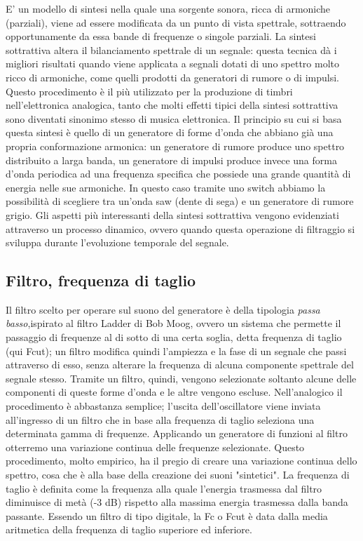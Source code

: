 \documentclass[
	a4paper,
	twocolumn
	]{article}
\begin{document}
E’ un modello di sintesi nella quale una sorgente sonora, ricca di armoniche
(parziali), viene ad essere modificata da un punto di vista spettrale,
sottraendo opportunamente da essa bande di frequenze o singole parziali. La
sintesi sottrattiva altera il bilanciamento spettrale di un segnale: questa
tecnica dà i migliori risultati quando viene applicata a segnali dotati di uno
spettro molto ricco di armoniche, come quelli prodotti da generatori di rumore
o di impulsi. Questo procedimento è il più utilizzato per la produzione di
timbri nell'elettronica analogica, tanto che molti effetti tipici della sintesi
sottrattiva sono diventati sinonimo stesso di musica elettronica. Il principio
su cui si basa questa sintesi è quello di un generatore di forme
d'onda che abbiano già una propria conformazione armonica: un generatore di
rumore produce uno spettro distribuito a larga banda, un generatore di impulsi
produce invece una forma d’onda periodica ad una frequenza specifica che
possiede una grande quantità di energia nelle sue armoniche. In questo caso
tramite uno switch abbiamo la possibilità di scegliere tra un’onda saw (dente
di sega) e un generatore di rumore grigio.
Gli aspetti più interessanti della sintesi sottrattiva vengono evidenziati
attraverso un processo dinamico, ovvero quando questa operazione di filtraggio
si sviluppa durante l’evoluzione temporale del segnale.

\subsection*{Filtro, frequenza di taglio}

Il filtro scelto per operare sul suono del generatore è della tipologia
\emph{passa basso},ispirato al filtro Ladder di Bob Moog, ovvero un sistema che
permette il passaggio di frequenze al di sotto di una certa soglia, detta
frequenza di taglio (qui Fcut); un filtro modifica quindi l’ampiezza e la fase
di un segnale che passi attraverso di esso, senza alterare la frequenza di
alcuna componente spettrale del segnale stesso.
Tramite un filtro, quindi, vengono selezionate soltanto alcune delle componenti
di queste forme d'onda e le altre vengono escluse. Nell'analogico il
procedimento è abbastanza semplice; l'uscita dell'oscillatore viene inviata
all'ingresso di un filtro che in base alla frequenza di taglio seleziona una
determinata gamma di frequenze. Applicando un generatore di funzioni al filtro
otterremo una variazione continua delle frequenze selezionate. Questo
procedimento, molto empirico, ha il pregio di creare una variazione continua
dello spettro, cosa che è alla base della creazione dei suoni "sintetici".
La frequenza di taglio è definita come la frequenza alla quale l’energia
trasmessa dal filtro diminuisce di metà (-3 dB) rispetto alla massima energia
trasmessa dalla banda passante. Essendo un filtro di tipo digitale, la Fc o
Fcut è data dalla media aritmetica della frequenza di taglio superiore ed
inferiore.
\end{document}
